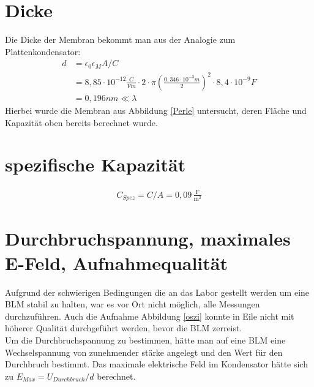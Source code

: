 \documentclass{include/thesisclass3}
\begin{document}
\section{Dicke}
Die Dicke der Membran bekommt man aus der Analogie zum Plattenkondensator:
\begin{align*}
	d&=\epsilon_0\epsilon_M A/C\\
	&=8,85\cdot 10^{-12}\frac{C}{Vm}\cdot 2\cdot \pi \left(\frac{0,346\cdot 10^{-3}m}{2}\right)^2\cdot 8,4\cdot 10^{-9}F\\
	&=0,196nm \ll \lambda
\end{align*}
Hierbei wurde die Membran aus Abbildung \ref{Perle} untersucht, deren Fläche und Kapazität oben bereits berechnet wurde. 

\section{spezifische Kapazität}
\begin{align*}
C_{Spez}=C/A=0,09 \, \frac{\text{F}}{\text{m}^2}
\end{align*}
\section{Durchbruchspannung, maximales E-Feld, Aufnahmequalität}
Aufgrund der schwierigen Bedingungen die an das Labor gestellt werden um eine BLM stabil zu halten, war es vor Ort nicht möglich, alle Messungen durchzuführen. Auch die Aufnahme Abbildung \ref{oszi} konnte in Eile nicht mit höherer Qualität durchgeführt werden, bevor die BLM zerreist.\\
Um die Durchbruchspannung zu bestimmen, hätte man auf eine BLM eine Wechselspannung von zunehmender stärke angelegt und den Wert für den Durchbruch bestimmt. Das maximale elektrische Feld im Kondensator hätte sich zu $E_{Max}=U_{Durchbruch}/d$ berechnet.
\end{document}
